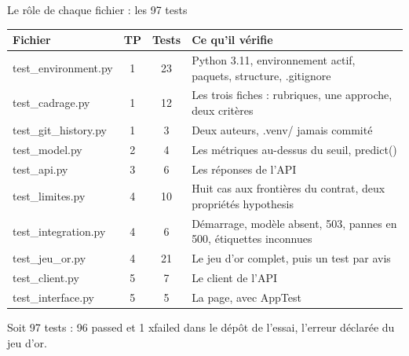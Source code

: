 \documentclass[aspectratio=169,11pt]{beamer}
\newcommand{\co}[1]{{\ttfamily\hyphenchar\font=45\relax #1}}
\begin{document}
\begin{frame}{Le rôle de chaque fichier : les 97 tests}
\scriptsize
\begin{tabularx}{\textwidth}{@{}l c c X@{}}
\toprule
\textbf{Fichier} & \textbf{TP} & \textbf{Tests} & \textbf{Ce qu'il vérifie} \\
\midrule
\co{test\_environment.py} & 1 & 23 & Python 3.11, environnement actif, paquets, structure, \co{.gitignore} \\
\co{test\_cadrage.py} & 1 & 12 & Les trois fiches : rubriques, une approche, deux critères \\
\co{test\_git\_history.py} & 1 & 3 & Deux auteurs, \co{.venv/} jamais commité \\
\co{test\_model.py} & 2 & 4 & Les métriques au-dessus du seuil, \co{predict()} \\
\co{test\_api.py} & 3 & 6 & Les réponses de l'API \\
\co{test\_limites.py} & 4 & 10 & Huit cas aux frontières du contrat, deux propriétés hypothesis \\
\co{test\_integration.py} & 4 & 6 & Démarrage, modèle absent, 503, pannes en 500, étiquettes inconnues \\
\co{test\_jeu\_or.py} & 4 & 21 & Le jeu d'or complet, puis un test par avis \\
\co{test\_client.py} & 5 & 7 & Le client de l'API \\
\co{test\_interface.py} & 5 & 5 & La page, avec \co{AppTest} \\
\bottomrule
\end{tabularx}

\medskip
\small Soit 97 tests : 96 passed et 1 xfailed dans le dépôt de l'essai, l'erreur déclarée du jeu d'or.
\end{frame}
\end{document}
